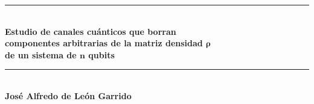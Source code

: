 \documentclass[12pt]{report}
\begin{document}
\begin{titlepage} %
\newcommand{\HRule}{\rule{\linewidth}{0.6mm}} %

\center %


\HRule\\[0.4cm]

{\LARGE\bfseries Estudio de canales cuánticos que borran\\
				 componentes arbitrarias de la matriz densidad $\boldsymbol{\rho}$\\
				 de un sistema de $\mathbf{n}$ qubits}\\[0.4cm] %

\HRule\\[2cm]



\Large{\textbf{José Alfredo de León Garrido}}\\[2cm]



\end{titlepage}
\end{document}
